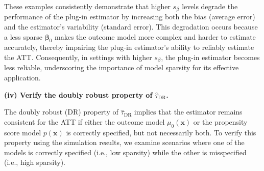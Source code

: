 \documentclass{article}
\begin{document}
These examples consistently demonstrate that higher \( s_\beta \) levels degrade the performance of the plug-in estimator by increasing both the bias (average error) and the estimator's variability (standard error). This degradation occurs because a less sparse \( \boldsymbol{\beta}_0 \) makes the outcome model more complex and harder to estimate accurately, thereby impairing the plug-in estimator's ability to reliably estimate the ATT. Consequently, in settings with higher \( s_\beta \), the plug-in estimator becomes less reliable, underscoring the importance of model sparsity for its effective application.

\textbf{(iv) Verify the doubly robust property of \( \hat{\tau}_{\text{DR}} \).}

The doubly robust (DR) property of \( \hat{\tau}_{\text{DR}} \) implies that the estimator remains consistent for the ATT if either the outcome model \( \mu_0(\mathbf{x}) \) or the propensity score model \( p(\mathbf{x}) \) is correctly specified, but not necessarily both. To verify this property using the simulation results, we examine scenarios where one of the models is correctly specified (i.e., low sparsity) while the other is misspecified (i.e., high sparsity).
\end{document}
